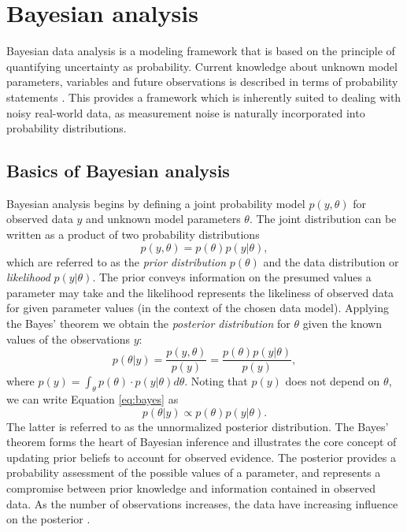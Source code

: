 
\section{Bayesian analysis}\label{bayesian-analysis}

Bayesian data analysis is a modeling framework that is based on the principle
of quantifying uncertainty as probability. Current knowledge about unknown
model parameters, variables and future observations is described in terms of
probability statements \citep{Gelman2013}. This provides a framework which
is inherently suited to dealing with noisy real-world data, as measurement
noise is naturally incorporated into probability distributions.

\subsection{Basics of Bayesian analysis}

Bayesian analysis begins by defining a joint probability model $p(y,\theta)$
for observed data $y$ and unknown model parameters $\theta$.
The joint distribution can be written as a product of two probability distributions
\begin{equation}
  p(y,\theta) = p(\theta) p(y|\theta),
\end{equation}
which are referred to as the \emph{prior distribution} $p(\theta)$ and the
data distribution or \emph{likelihood} $p(y|\theta)$. The prior conveys
information on the presumed values a parameter may take and the likelihood
represents the likeliness of observed data for given parameter values (in the
context of the chosen data model). Applying the Bayes' theorem we obtain the
\emph{posterior distribution} for $\theta$ given the known values of the
observations $y$:
\begin{equation}
  \label{eq:bayes}
  p(\theta|y) = \frac{p(y,\theta)}{p(y)} = \frac{p(\theta) p(y|\theta)}{p(y)},
\end{equation}
where $p(y) = \int_{\theta} p(\theta) \cdot p(y|\theta) d\theta$.
Noting that $p(y)$ does not depend on $\theta$, we can write Equation
\eqref{eq:bayes} as
\begin{equation}
  p(\theta|y) \propto p(\theta) p(y|\theta).
\end{equation}
The latter is referred to as the unnormalized posterior distribution. The
Bayes' theorem forms the heart of Bayesian inference and illustrates the core
concept of updating prior beliefs to account for observed evidence. The
posterior provides a probability assessment of the possible values of
a parameter, and represents a compromise between prior knowledge and information
contained in observed data. As the number of observations increases, the
data have increasing influence on the posterior \citep{Gelman2013}.

